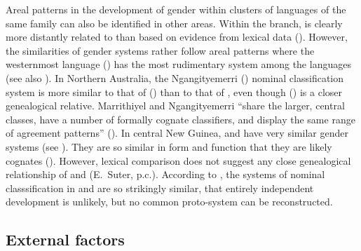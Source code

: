 \documentclass[output=collectionpaper]{langsci/langscibook}
\begin{document}
Areal patterns in the development of gender within clusters of languages of the same family can also be identified in other areas. Within the   branch,  is clearly more distantly related to  than  based on evidence from lexical data (\citealt[6]{Nagaraja2013}). However, the similarities of gender systems rather follow areal patterns where the westernmost language  (\citealt{Nagaraja1996}) has the most rudimentary system among the  languages (see also ). In Northern Australia, the Ngan\textquotesingle{}gityemerri  () nominal classification system is more similar to that of  () than to that of , even though  () is a closer genealogical relative. Marrithiyel and Ngan\textquotesingle{}gityemerri ``share the larger, central classes, have a number of formally cognate classifiers, and display the same range of agreement patterns'' (\citealt[233]{Green1997}). In central New Guinea,  and  have very similar gender systems (see ). They are so similar in form and function that they are likely cognates (\citealt[118]{Usher2015}). However, lexical comparison does not suggest any close genealogical relationship of  and  (E.~Suter, p.c.). According to \cite{Seifart2007}, the systems of nominal classsification in  and  are so strikingly similar, that entirely independent development is unlikely, but no common proto-system can be reconstructed.


  \subsection{External factors}
  \label{sec:WDG:11.2}
\end{document}
